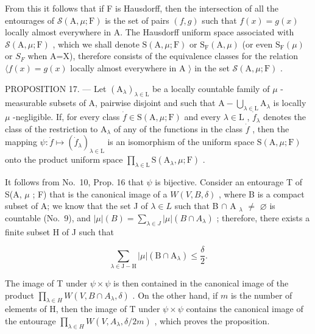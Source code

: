 From this it follows that if F is Hausdorff, then the intersection of all the entourages of \(\mathcal{S}(\mathrm{A},\mu;\mathrm{F})\) is the set of pairs \((f,g)\) such that \(f(x)=g(x)\) locally almost everywhere in A. The Hausdorff uniform space associated with \(\mathcal{S}(\mathrm{A},\mu;\mathrm{F})\) , which we shall denote \(\mathrm{S}(\mathrm{A},\mu;\mathrm{F})\) or \(\mathrm{S}_{\mathrm{F}}(\mathrm{A},\mu)\) (or even \(\mathrm{S}_{\mathrm{F}}(\mu)\) or \(S_{F}\) when A=X), therefore consists of the equivalence classes for the relation \(\langle f(x)=g(x)\) locally almost everywhere in A \(\rangle\) in the set \(\mathcal{S}(\mathrm{A},\mu;\mathrm{F})\) .

PROPOSITION 17. --- Let \((\mathrm{A}_{\lambda})_{\lambda \in \mathrm{L}}\) be a locally countable family of \(\mu\) -measurable subsets of A, pairwise disjoint and such that \(\mathrm{A} - \bigcup_{\lambda \in \mathrm{L}} \mathrm{A}_{\lambda}\) is locally \(\mu\) -negligible. If, for every class \(\dot{f} \in \mathrm{S}(\mathrm{A}, \mu; \mathrm{F})\) and every \(\lambda \in \mathrm{L}\) , \(\dot{f}_{\lambda}\) denotes the class of the restriction to \(\mathrm{A}_{\lambda}\) of any of the functions in the class \(\dot{f}\) , then the mapping \(\psi: \dot{f} \mapsto (\dot{f}_{\lambda})_{\lambda \in \mathrm{L}}\) is an isomorphism of the uniform space \(\mathrm{S}(\mathrm{A}, \mu; \mathrm{F})\) onto the product uniform space \(\prod_{\lambda \in \mathrm{L}} \mathrm{S}(\mathrm{A}_{\lambda}, \mu; \mathrm{F})\) .

It follows from No.~10, Prop. 16 that \(\psi\) is bijective. Consider an entourage T of S(A, \(\mu\) ; F) that is the canonical image of a \(W(V, B, \delta)\) , where B is a compact subset of A; we know that the set J of \(\lambda \in L\) such that B \(\cap\) A \(_{\lambda}\) \(\neq\) \(\varnothing\) is countable (No.~9), and \(|\mu|(B) = \sum_{\lambda \in J} |\mu|(B \cap A_{\lambda})\) ; therefore, there exists a finite subset H of J such that

\[
\sum_ {\lambda \in \mathrm{J} - \mathrm{H}} | \mu | (\mathrm{B} \cap \mathrm{A} _ {\lambda}) \leqslant \frac {\delta}{2}.
\]

The image of T under \(\psi \times \psi\) is then contained in the canonical image of the product \(\prod_{\lambda \in H} W(V, B \cap A_{\lambda}, \delta)\) . On the other hand, if \(m\) is the number of elements of H, then the image of T under \(\psi \times \psi\) contains the canonical image of the entourage \(\prod_{\lambda \in H} W(V, A_{\lambda}, \delta / 2m)\) , which proves the proposition.


